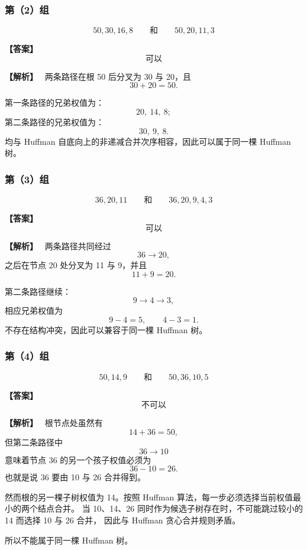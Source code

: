 \documentclass[12pt,a4paper]{ctexart}
\newenvironment{solution}
{\par\noindent\textbf{\color{answerblue}【解析】}\ }
{\par}
\newenvironment{answer}
{\par\noindent\textbf{\color{darkgreen}【答案】}\ }
{\par}
\begin{document}
\subsubsection*{第（2）组}
\[
50,30,16,8
\qquad\text{和}\qquad
50,20,11,3
\]

\begin{answer}
\[
\boxed{\text{可以}}
\]
\end{answer}

\begin{solution}
两条路径在根 50 后分叉为 30 与 20，且
\[
30+20=50.
\]

第一条路径的兄弟权值为：
\[
20,\ 14,\ 8;
\]
第二条路径的兄弟权值为：
\[
30,\ 9,\ 8.
\]
均与 Huffman 自底向上的非递减合并次序相容，因此可以属于同一棵 Huffman 树。
\end{solution}

\subsubsection*{第（3）组}
\[
36,20,11
\qquad\text{和}\qquad
36,20,9,4,3
\]

\begin{answer}
\[
\boxed{\text{可以}}
\]
\end{answer}

\begin{solution}
两条路径共同经过
\[
36\to20,
\]
之后在节点 20 处分叉为 11 与 9，并且
\[
11+9=20.
\]

第二条路径继续：
\[
9\to4\to3,
\]
相应兄弟权值为
\[
9-4=5,\qquad 4-3=1.
\]
不存在结构冲突，因此可以兼容于同一棵 Huffman 树。
\end{solution}

\subsubsection*{第（4）组}
\[
50,14,9
\qquad\text{和}\qquad
50,36,10,5
\]

\begin{answer}
\[
\boxed{\text{不可以}}
\]
\end{answer}

\begin{solution}
根节点处虽然有
\[
14+36=50,
\]
但第二条路径中
\[
36\to10
\]
意味着节点 36 的另一个孩子权值必须为
\[
36-10=26.
\]
也就是说 36 要由 10 与 26 合并得到。

然而根的另一棵子树权值为 14。按照 Huffman 算法，每一步必须选择当前权值最小的两个结点合并。
当 10、14、26 同时作为候选子树存在时，不可能跳过较小的 14 而选择 10 与 26 合并，
因此与 Huffman 贪心合并规则矛盾。

所以不能属于同一棵 Huffman 树。
\end{solution}
\end{document}

